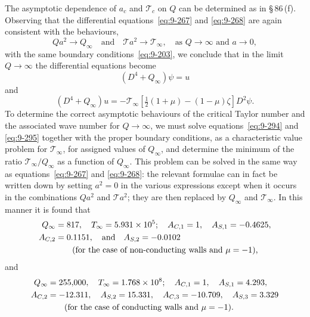 The asymptotic dependence of $a_c$ and $\mathscr{T}_c$ on $Q$ can be determined as in \S\,86\,(f). Observing that the differential equations~\eqref{eq:9-267} and \eqref{eq:9-268} are again consistent with the behaviours,
\begin{equation}
Qa^2 \to Q_\infty \quad \text{and} \quad \mathscr{T} a^2 \to \mathscr{T}_\infty, \quad \text{as } Q \to \infty \text{ and } a \to 0, \label{eq:9-293}
\end{equation}
with the same boundary conditions~\eqref{eq:9-203}, we conclude that in the limit $Q \to \infty$ the differential equations become
\begin{equation}
(D^4 + Q_\infty)\psi = u \label{eq:9-294}
\end{equation}
and
\begin{equation}
(D^4 + Q_\infty)u = -\mathscr{T}_\infty[\tfrac{1}{2}(1+\mu) - (1-\mu)\zeta]D^2\psi. \label{eq:9-295}
\end{equation}
To determine the correct asymptotic behaviours of the critical Taylor number and the associated wave number for $Q \to \infty$, we must solve equations~\eqref{eq:9-294} and \eqref{eq:9-295} together with the proper boundary conditions, as a characteristic value problem for $\mathscr{T}_\infty$, for assigned values of $Q_\infty$, and determine the minimum of the ratio $\mathscr{T}_\infty/Q_\infty$ as a function of $Q_\infty$. This problem can be solved in the same way as equations~\eqref{eq:9-267} and \eqref{eq:9-268}: the relevant formulae can in fact be written down by setting $a^2 = 0$ in the various expressions except when it occurs in the combinations $Qa^2$ and $\mathscr{T} a^2$; they are then replaced by $Q_\infty$ and $\mathscr{T}_\infty$. In this manner it is found that
\begin{align}
Q_\infty &= 817, \quad \mathscr{T}_\infty = 5.931 \times 10^5; \quad A_{C,1} = 1, \quad A_{S,1} = -0.4625, \notag \\
A_{C,2} &= 0.1151, \quad \text{and} \quad A_{S,2} = -0.0102 \notag \\
&\qquad \text{(for the case of non-conducting walls and } \mu = -1\text{),} \label{eq:9-296}
\end{align}
and
\begin{align}
Q_\infty &= 255{,}000, \quad \mathscr{T}_\infty = 1.768 \times 10^8; \quad A_{C,1} = 1, \quad A_{S,1} = 4.293, \notag \\
A_{C,2} &= -12.311, \quad A_{S,2} = 15.331, \quad A_{C,3} = -10.709, \quad A_{S,3} = 3.329 \notag \\
&\qquad \text{(for the case of conducting walls and } \mu = -1\text{).} \label{eq:9-297}
\end{align}

